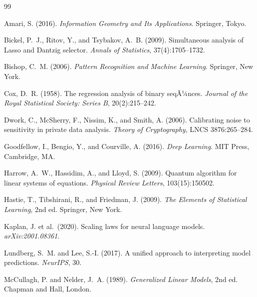 ﻿\documentclass[12pt, a4paper]{article}
\theoremstyle{definition}
\theoremstyle{remark}
\begin{document}

\begin{thebibliography}{99}

Amari, S. (2016).
\newblock \textit{Information Geometry and Its Applications}.
\newblock Springer, Tokyo.

Bickel, P.~J., Ritov, Y., and Tsybakov, A.~B. (2009).
\newblock Simultaneous analysis of Lasso and Dantzig selector.
\newblock \textit{Annals of Statistics}, 37(4):1705--1732.

Bishop, C.~M. (2006).
\newblock \textit{Pattern Recognition and Machine Learning}.
\newblock Springer, New York.

Cox, D.~R. (1958).
\newblock The regression analysis of binary seqÃ¼nces.
\newblock \textit{Journal of the Royal Statistical Society: Series B}, 20(2):215--242.

Dwork, C., McSherry, F., Nissim, K., and Smith, A. (2006).
\newblock Calibrating noise to sensitivity in private data analysis.
\newblock \textit{Theory of Cryptography}, LNCS 3876:265--284.

Goodfellow, I., Bengio, Y., and Courville, A. (2016).
\newblock \textit{Deep Learning}.
\newblock MIT Press, Cambridge, MA.

Harrow, A.~W., Hassidim, A., and Lloyd, S. (2009).
\newblock Quantum algorithm for linear systems of equations.
\newblock \textit{Physical Review Letters}, 103(15):150502.

Hastie, T., Tibshirani, R., and Friedman, J. (2009).
\newblock \textit{The Elements of Statistical Learning}, 2nd ed.
\newblock Springer, New York.

Kaplan, J. et al.\ (2020).
\newblock Scaling laws for neural language models.
\newblock \textit{arXiv:2001.08361}.

Lundberg, S.~M. and Lee, S.-I. (2017).
\newblock A unified approach to interpreting model predictions.
\newblock \textit{NeurIPS}, 30.

McCullagh, P. and Nelder, J.~A. (1989).
\newblock \textit{Generalized Linear Models}, 2nd ed.
\newblock Chapman and Hall, London.


\end{thebibliography}
\end{document}
